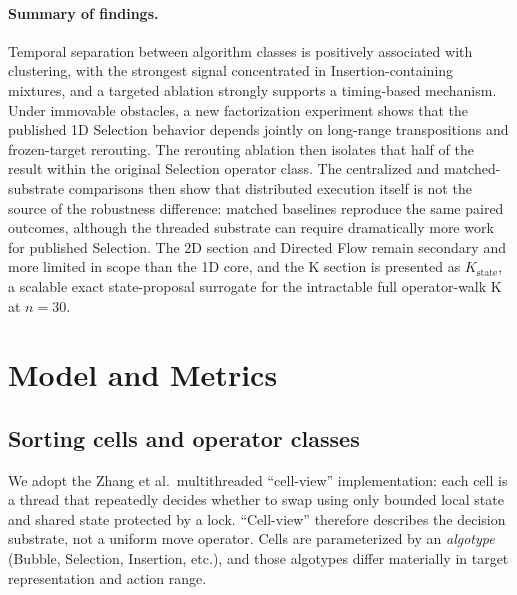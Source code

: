 \documentclass[11pt]{article}
\begin{document}
\paragraph{Summary of findings.}
Temporal separation between algorithm classes is positively associated with clustering, with the
strongest signal concentrated in Insertion-containing mixtures, and a targeted ablation strongly
supports a timing-based mechanism. Under immovable obstacles, a new factorization experiment shows
that the published 1D Selection behavior depends jointly on long-range transpositions and
frozen-target rerouting. The rerouting ablation then isolates that half of the result within the
original Selection operator class. The centralized and matched-substrate comparisons then show that
distributed execution itself is not the
source of the robustness difference: matched baselines reproduce the same paired outcomes, although
the threaded substrate can require dramatically more work for published Selection. The 2D section
and Directed Flow remain secondary and more limited in scope than the 1D core, and the K section
is presented as $K_{\mathrm{state}}$, a scalable exact state-proposal surrogate for the
intractable full operator-walk K at $n=30$.

\section{Model and Metrics}
\label{sec:methods}
\subsection{Sorting cells and operator classes}
We adopt the Zhang et al.\ multithreaded ``cell-view'' implementation: each cell is a thread that
repeatedly decides whether to swap using only bounded local state and shared state protected by a
lock. ``Cell-view'' therefore describes the decision substrate, not a uniform move operator.
Cells are parameterized by an \emph{algotype} (Bubble, Selection, Insertion, etc.), and those
algotypes differ materially in target representation and action range.
\end{document}
